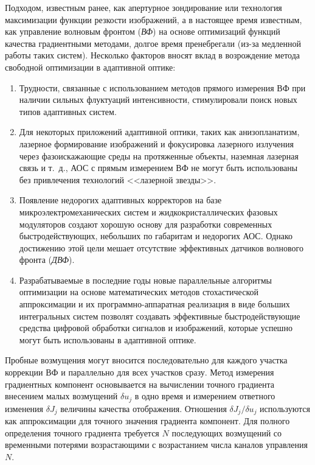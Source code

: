\documentclass[pscyr,titlepage]{hedreport}
\newcommand{\de}{\delta}
\begin{document}
Подходом, известным ранее, как апертурное зондирование или технология
максимизации функции резкости изображений, а в настоящее время известным, как
управление волновым фронтом (\emph{ВФ}) на основе оптимизаций функций качества
градиентными методами, долгое время пренебрегали (из-за медленной работы таких
систем). Несколько факторов вносят вклад в возрождение метода свободной
оптимизации в адаптивной оптике:
\begin{enumerate}
  \item Трудности, связанные с использованием методов прямого измерения ВФ при
    наличии сильных флуктуаций интенсивности, стимулировали поиск новых типов
    адаптивных систем.
  \item Для некоторых приложений адаптивной оптики, таких как анизопланатизм,
    лазерное формирование изображений и фокусировка лазерного излучения через
    фазоискажающие среды на протяженные объекты, наземная лазерная связь и т.~д.,
    АОС с прямым измерением ВФ не могут быть использованы без привлечения
    технологий <<лазерной звезды>>.
  \item Появление недорогих адаптивных корректоров на базе
    микроэлектромеханических систем и жидкокристаллических фазовых модуляторов
    создают хорошую основу для разработки современных быстродействующих,
    небольших по габаритам и недорогих АОС. Однако достижению этой цели мешает
    отсутствие эффективных датчиков волнового фронта (\emph{ДВФ}).
  \item Разрабатываемые в последние годы новые параллельные алгоритмы
    оптимизации на основе математических методов стохастической аппроксимации и
    их программно-аппаратная реализация в виде больших интегральных систем
    позволят создавать эффективные быстродействующие средства цифровой обработки
    сигналов и изображений, которые успешно могут быть использованы в адаптивной
    оптике.
\end{enumerate}

Пробные возмущения могут вносится последовательно для каждого участка коррекции
ВФ и параллельно для всех участков сразу. Метод измерения градиентных компонент
основывается на вычислении точного градиента внесением малых возмущений 
\( \de u_j \) в одно время и измерением ответного изменения \( \de J_j \)
величины качества отображения. Отношения \( \de J_j / \de u_j \)
используются как аппроксимации для точного значения градиента компонент. Для
полного определения точного градиента требуется \( N \) последующих возмущений
со временными потерями возрастающими с возрастанием числа каналов управления
\( N \).
\end{document}
